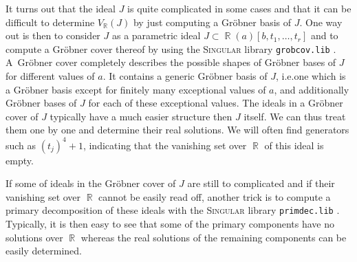 \documentclass[noend]{amsproc}
\theoremstyle{definition}
\newcommand{\Singular}{\textsc{Singular}}
\DeclareMathOperator{\R}{\mathbb{R}}
\begin{document}
It turns out that the ideal $J$ is quite complicated in some cases and that it
can be difficult to determine $V_{\R}(J)$ by just computing a Gr\"obner basis
of $J$. One way out is then to consider $J$ as a parametric ideal
$J \subset \R(a)[b,t_1,\ldots,t_r]$ and to compute a Gr\"obner cover thereof
by using the \Singular{} library \verb+grobcov.lib+ \citep{grobcov}.
A~Gr\"obner cover completely describes the possible shapes of Gr\"obner bases
of $J$ for different values of $a$. It contains a generic Gr\"obner basis of
$J$, i.e.\@ one which is a Gr\"obner basis except for finitely many exceptional
values of $a$, and additionally Gr\"obner bases of $J$ for each of these
exceptional values. The ideals in a Gr\"obner cover of $J$ typically have a
much easier structure then $J$ itself. We can thus treat them one by one and
determine their real solutions. We will often find generators such as
$(t_j)^4+1$, indicating that the vanishing set over $\R$ of this ideal is
empty.

If some of ideals in the Gr\"obner cover of $J$ are still to complicated and if
their vanishing set over $\R$ cannot be easily read off, another trick is to
compute a primary decomposition of these ideals with the \Singular{} library
\verb+primdec.lib+ \citep{primdec}. Typically, it is then easy to see that
some of the primary components have no solutions over $\R$ whereas the real
solutions of the remaining components can be easily determined.
\end{document}
